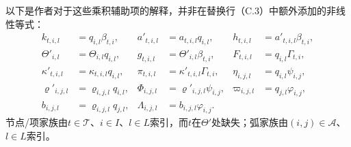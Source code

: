 \documentclass{article}
\begin{document}
以下是作者对于这些乘积辅助项的解释，并非在替换行（C.3）中额外添加的非线性等式：
\begin{align*}
k_{t,i,l}&=q_{i,l}\beta_{t,i},&
a'_{t,i,l}&=a_{t,i,l}q_{i,l},&
h_{t,i,l}&=a'_{t,i,l}\beta_{t,i},\\
\Theta'_{i,l}&=\Theta_{i,l}q_{i,l},&
g_{t,i,l}&=\Theta'_{i,l}\beta_{t,i},&
F_{t,i,l}&=q_{i,l}\Gamma_{t,i},\\
\kappa'_{t,i,l}&=\kappa_{t,i,l}q_{i,l},&
\pi_{t,i,l}&=\kappa'_{t,i,l}\Gamma_{t,i},&
\eta_{i,j,l}&=q_{i,l}\psi_{i,j},\\
\varrho'_{i,j,l}&=\varrho_{i,j,l}q_{i,l},&
\Phi_{i,j,l}&=\varrho'_{i,j,l}\psi_{i,j},&
\varpi_{i,j,l}&=q_{j,l}\varphi_{i,j},\\
b_{i,j,l}&=\varrho_{i,j,l}q_{j,l},&
\Lambda_{i,j,l}&=b_{i,j,l}\varphi_{i,j}.&&
\end{align*}
节点/项家族由$t\in\mathcal T$、$i\in I$、$l\in L$索引，而$t$在$\Theta'$处缺失；弧家族由$(i,j)\in\mathcal A$、$l\in L$索引。
\end{document}
